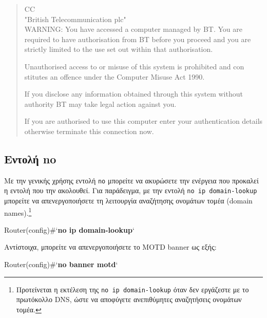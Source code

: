 \documentclass{EdipyLabs} %
\begin{document}
\begin{quote}\ttfamily\singlespacing
	CC\\
	"British Telecommunication plc"\\
	WARNING: You have accessed a computer managed by BT. You are required
	to have authorisation from BT before you proceed and you are strictly
	limited to the use set out within that authorisation.
	
	Unauthorised access to or misuse of this system is prohibited and con\\stitutes an offence under the Computer Misuse Act 1990.
	
	If you disclose any information obtained through this system without
	authority BT may take legal action against you.
	
	If you are authorised to use this computer enter your authentication
	details otherwise terminate this connection now.
\end{quote}
 
\subsection{Εντολή no}
Με την γενικής χρήσης εντολή \texttt{no} μπορείτε να ακυρώσετε την ενέργεια που προκαλεί η εντολή που την ακολουθεί. Για παράδειγμα, με την εντολή \texttt{no ip domain-lookup} μπορείτε να απενεργοποιήσετε τη λειτουργία αναζήτησης ονομάτων τομέα (domain names).\footnote{Προτείνεται η εκτέλεση της \texttt{no ip domain-lookup} όταν δεν εργάζεστε με το πρωτόκολλο DNS, ώστε να αποφύγετε ανεπιθύμητες αναζητήσεις ονομάτων τομέα.}

\begin{CommandBox}
Router(config)#`\textbf{no ip domain-lookup}`
\end{CommandBox}

Αντίστοιχα, μπορείτε να απενεργοποιήσετε το MOTD banner ως εξής: 

\begin{CommandBox}
Router(config)#`\textbf{no banner motd}`
\end{CommandBox}
\end{document}
